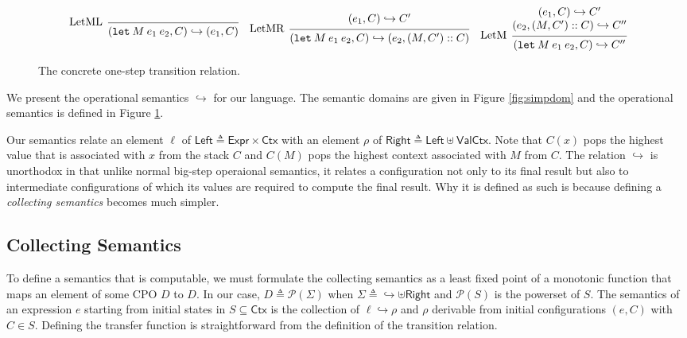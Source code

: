 \documentclass[acmsmall,screen,review]{acmart}\settopmatter{printfolios=true,printccs=false,printacmref=false}
\newcommand*{\cons}{::}
\newcommand*{\pset}{\mathcal{P}}
\newcommand*{\Expr}{\mathsf{Expr}}
\newcommand*{\Ctx}{\mathsf{Ctx}}
\newcommand*{\Value}{\mathsf{Val}}
\newcommand*{\Left}{\mathsf{Left}}
\newcommand*{\Right}{\mathsf{Right}}
\newcommand*{\semarrow}{\hookrightarrow}
\begin{document}
\begin{figure}[h!]
  \[
    \begin{prooftree}
      \infer[left label=LetML]0{
      (\mathtt{let}\:M\:e_{1}\:e_{2}, C)
      \semarrow
      (e_{1}, C)
      }
    \end{prooftree}\quad
    \begin{prooftree}
      \hypo{
        \begin{matrix}
          (e_{1}, C)
          \semarrow
          C'
        \end{matrix}
      }
      \infer[left label=LetMR]1{
      (\mathtt{let}\:M\:e_{1}\:e_{2}, C)
      \semarrow
      (e_{2}, (M, C')\cons C)
      }
    \end{prooftree}\quad
    \begin{prooftree}
      \hypo{
        \begin{matrix}
          (e_{1}, C)
          \semarrow
          C' \\
          (e_{2}, (M, C')\cons C)
          \semarrow
          C''
        \end{matrix}
      }
      \infer[left label=LetM]1{
      (\mathtt{let}\:M\:e_{1}\:e_{2}, C)
      \semarrow
      C''
      }
    \end{prooftree}
  \]
  \caption{The concrete one-step transition relation.}
  \label{fig:simpreach}
\end{figure}
We present the operational semantics $\semarrow$ for our language.
The semantic domains are given in Figure \ref{fig:simpdom} and the operational semantics is defined in Figure \ref{fig:simpreach}.

Our semantics relate an element $\ell$ of $\Left\triangleq\Expr\times\Ctx$ with an element $\rho$ of $\Right\triangleq\Left\uplus\Value\Ctx$.
Note that $C(x)$ pops the highest value that is associated with $x$ from the stack $C$ and $C(M)$ pops the highest context associated with $M$ from $C$.
The relation $\semarrow$ is unorthodox in that unlike normal big-step operaional semantics, it relates a configuration not only to its final result but also to intermediate configurations of which its values are required to compute the final result.
Why it is defined as such is because defining a \emph{collecting semantics} becomes much simpler.

\subsection{Collecting Semantics}
To define a semantics that is computable, we must formulate the collecting semantics as a least fixed point of a monotonic function that maps an element of some CPO $D$ to $D$.
In our case, $D\triangleq\pset(\Sigma)$ when $\Sigma\triangleq\semarrow\uplus\Right$ and $\pset(S)$ is the powerset of $S$.
The semantics of an expression $e$ starting from initial states in $S\subseteq\Ctx$ is the collection of $\ell\semarrow\rho$ and $\rho$ derivable from initial configurations $(e,C)$ with $C\in S$.
Defining the transfer function is straightforward from the definition of the transition relation.
\end{document}
